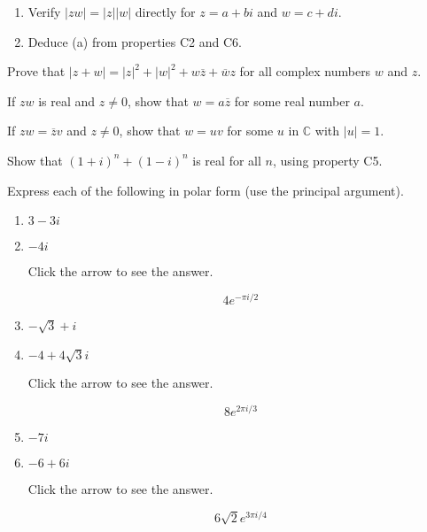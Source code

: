 \documentclass{ximera}
\begin{document}
\begin{problem}\label{prb:A.13}
\begin{enumerate}[label={\alph*.}]
\item Verify $|zw| = |z||w|$ directly for $z = a + bi$ and $w = c + di$.

\item Deduce (a) from properties C2 and C6.

\end{enumerate}
\end{problem}

\begin{problem}\label{prb:A.14}
Prove that $|z+w| = |z|^2 + |w|^2 + w\overline{z} + \overline{w}z$
 for all complex numbers $w$ and $z$.
\end{problem}

\begin{problem}\label{prb:A.15}
If $zw$ is real and $z \neq 0$, show that $w = a \overline{z}$
 for some real number $a$.
\end{problem}

\begin{problem}\label{prb:A.16}
If $zw = \overline{z}v$
 and $z \neq 0$, show that $w = uv$ for some $u$ in $\mathbb{C}$  with $|u| = 1$.
\end{problem}

\begin{problem}\label{prb:A.17}
Show that $(1 + i)^{n} + (1 - i)^{n}$ is real for all $n$, using property C5.
\end{problem}

\begin{problem}\label{prb:A.18}
Express each of the following in polar form (use the principal argument).

\begin{enumerate}
\item $3 - 3i$
\item $-4i$

Click the arrow to see the answer.
\begin{expandable}{}{}
 $$4e^{-\pi i/2}$$
\end{expandable}

\item $-\sqrt{3} + i$
\item $-4 + 4\sqrt{3}i$

Click the arrow to see the answer.
\begin{expandable}{}{}
$$8e^{2\pi i/3}$$
\end{expandable}

\item $-7i$
\item $-6 + 6i$

Click the arrow to see the answer.
\begin{expandable}{}{}
 $$6\sqrt{2}e^{3\pi i/4}$$
\end{expandable}

\end{enumerate}
\end{problem}
\end{document}

